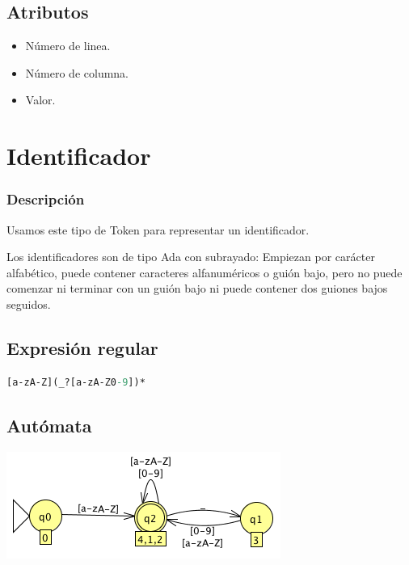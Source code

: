         \subsection{Atributos}
        
            \begin{itemize}
                \item Número de linea.
                \item Número de columna.
                \item Valor.
            \end{itemize}
            
            \hfill
            \clearpage
            


	\section{Identificador}

        \subsubsection{Descripción}
        
            Usamos este tipo de Token para representar un identificador.
            
            Los identificadores son de tipo Ada con subrayado: Empiezan por carácter alfabético, puede contener caracteres alfanuméricos o guión bajo, pero no puede comenzar ni terminar con un guión bajo ni puede contener dos guiones bajos seguidos.
            
        \subsection{Expresión regular}

            \begin{lstlisting}[language=Perl]
[a-zA-Z](_?[a-zA-Z0-9])*
            \end{lstlisting}

        \subsection{Autómata}
        
            \includegraphics[scale=.7]{../Design/jflap/Identificador.png}

